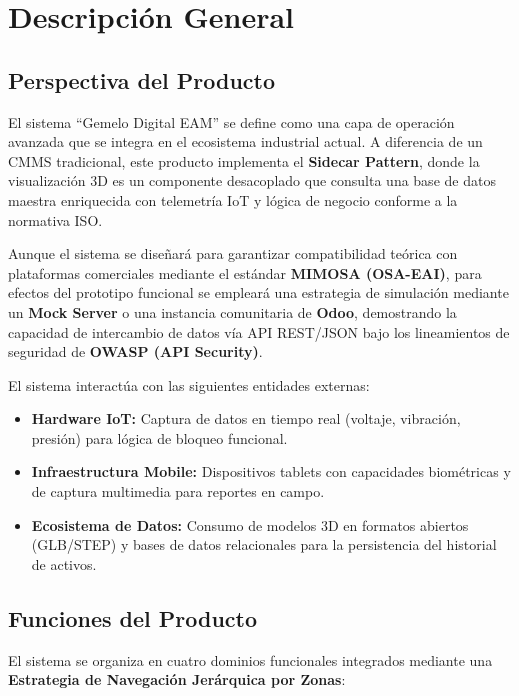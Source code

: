 \section{Descripción General}

\subsection{Perspectiva del Producto}
El sistema ``Gemelo Digital EAM'' se define como una capa de operación avanzada que se integra en el ecosistema industrial actual. A diferencia de un CMMS tradicional, este producto implementa el \textbf{Sidecar Pattern}, donde la visualización 3D es un componente desacoplado que consulta una base de datos maestra enriquecida con telemetría IoT y lógica de negocio conforme a la normativa ISO.

Aunque el sistema se diseñará para garantizar compatibilidad teórica con plataformas comerciales mediante el estándar \textbf{MIMOSA (OSA-EAI)}, para efectos del prototipo funcional se empleará una estrategia de simulación mediante un \textbf{Mock Server} o una instancia comunitaria de \textbf{Odoo}, demostrando la capacidad de intercambio de datos vía API REST/JSON bajo los lineamientos de seguridad de \textbf{OWASP (API Security)}.

El sistema interactúa con las siguientes entidades externas:

\begin{itemize}
    \item \textbf{Hardware IoT:} Captura de datos en tiempo real (voltaje, vibración, presión) para lógica de bloqueo funcional.
    \item \textbf{Infraestructura Mobile:} Dispositivos tablets con capacidades biométricas y de captura multimedia para reportes en campo.
    \item \textbf{Ecosistema de Datos:} Consumo de modelos 3D en formatos abiertos (GLB/STEP) y bases de datos relacionales para la persistencia del historial de activos.
\end{itemize}
\subsection{Funciones del Producto}
El sistema se organiza en cuatro dominios funcionales integrados mediante una \textbf{Estrategia de Navegación Jerárquica por Zonas}:

